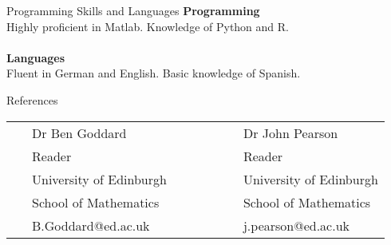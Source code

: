 \documentclass{resume} %
\begin{document}
	\begin{rSection}{Programming Skills and Languages}
		{\bf Programming}\\
		Highly proficient in Matlab. Knowledge of Python and R.\\
		\\
		{\bf Languages}\\
		Fluent in German and English. Basic knowledge of Spanish.
	\end{rSection}
\begin{rSection}{References}
	\begin{table}[h]
			\begin{tabular}{llll}
			\ &	Dr Ben Goddard & \ \ \ \ \ \ \ \ &{Dr John Pearson}\\
			\  &	Reader & \ \ \ \ \ \ \ \ &Reader \\
			\ &	University of Edinburgh & \ \ \ \ \ \ \ \ & University of Edinburgh\\
			\  &	School of Mathematics & \ \ \ \ \ \ \ \ &School of Mathematics\\
			\  &	B.Goddard@ed.ac.uk & \ \ \ \ \ \ \ \ &j.pearson@ed.ac.uk                        
			\end{tabular}
	\end{table}

\end{rSection}	
	
\end{document}
